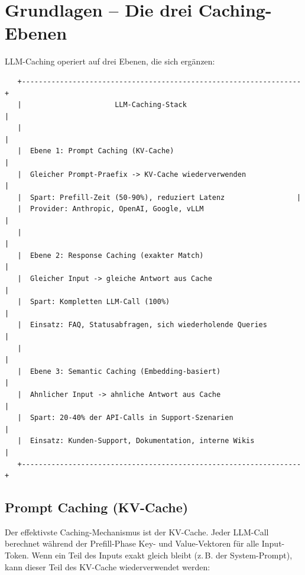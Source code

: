 \section{Grundlagen -- Die drei Caching-Ebenen}

LLM-Caching operiert auf drei Ebenen, die sich ergänzen:

\begin{verbatim}
   +------------------------------------------------------------------+
   |                      LLM-Caching-Stack                            |
   |                                                                   |
   |  Ebene 1: Prompt Caching (KV-Cache)                              |
   |  Gleicher Prompt-Praefix -> KV-Cache wiederverwenden             |
   |  Spart: Prefill-Zeit (50-90%), reduziert Latenz                 |
   |  Provider: Anthropic, OpenAI, Google, vLLM                       |
   |                                                                   |
   |  Ebene 2: Response Caching (exakter Match)                       |
   |  Gleicher Input -> gleiche Antwort aus Cache                     |
   |  Spart: Kompletten LLM-Call (100%)                               |
   |  Einsatz: FAQ, Statusabfragen, sich wiederholende Queries        |
   |                                                                   |
   |  Ebene 3: Semantic Caching (Embedding-basiert)                   |
   |  Ahnlicher Input -> ahnliche Antwort aus Cache                   |
   |  Spart: 20-40% der API-Calls in Support-Szenarien                |
   |  Einsatz: Kunden-Support, Dokumentation, interne Wikis           |
   +------------------------------------------------------------------+
\end{verbatim}

\subsection{Prompt Caching (KV-Cache)}

Der effektivste Caching-Mechanismus ist der KV-Cache. Jeder LLM-Call berechnet während der Prefill-Phase Key- und Value-Vektoren für alle Input-Token. Wenn ein Teil des Inputs exakt gleich bleibt (z.\,B. der System-Prompt), kann dieser Teil des KV-Cache wiederverwendet werden:

